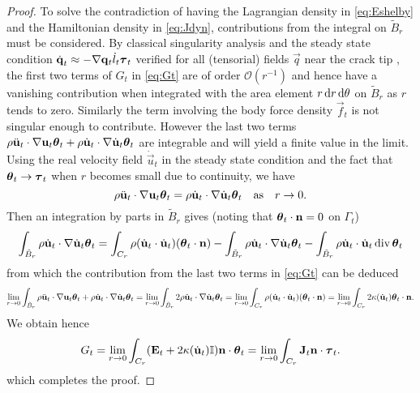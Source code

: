 \begin{proof}
To solve the contradiction \cite{Maugin:1994} of having the Lagrangian density in \eqref{eq:Eshelby} and the Hamiltonian density in \eqref{eq:Jdyn}, contributions from the integral on $\tilde{B}_r$ must be considered. By classical singularity analysis and the steady state condition $\dot{\vec{q}}_t\approx-\nabla\vec{q}_t\dot{l}_t\vtau_t$ verified for all (tensorial) fields $\vec{q}$ near the crack tip \cite{Freund:1990}, the first two terms of $G_t$ in \eqref{eq:Gt} are of order $\mathcal{O}(r^{-1})$ and hence have a vanishing contribution when integrated with the area element $r\,\mathrm{d}r\,\mathrm{d}\theta$ on $\tilde{B}_r$ as $r$ tends to zero. Similarly the term involving the body force density $\vec{f}_t$ is not singular enough to contribute. However the last two terms $\rho\ddot{\vec{u}}_t\cdot\nabla\vec{u}_t\vtheta_t+\rho\dot{\vec{u}}_t\cdot\nabla\dot{\vec{u}}_t\vtheta_t$ are integrable \cite{NishiokaAtluri:1983,NakamuraShihFreund:1985} and will yield a finite value in the limit. Using the real velocity field $\dot{\vec{u}}_t$ in the steady state condition and the fact that $\vtheta_t\to\vtau_t$ when $r$ becomes small due to continuity, we have
\[
\rho\ddot{\vec{u}}_t\cdot\nabla\vec{u}_t\vtheta_t=\rho\dot{\vec{u}}_t\cdot\nabla\dot{\vec{u}}_t\vtheta_t\quad\text{as}\quad r\to 0.
\]
Then an integration by parts in $\tilde{B}_r$ gives (noting that $\vtheta_t\cdot\vec{n}=0$ on $\Gamma_t$)
\begin{equation} \label{eq:magicformula}
\int_{\tilde{B}_r}\rho\dot{\vec{u}}_t\cdot\nabla\dot{\vec{u}}_t\vtheta_t=\int_{C_r}\rho(\dot{\vec{u}}_t\cdot\dot{\vec{u}}_t)(\vtheta_t\cdot\vec{n})-\int_{\tilde{B}_r}\rho\dot{\vec{u}}_t\cdot\nabla\dot{\vec{u}}_t\vtheta_t-\int_{\tilde{B}_r}\rho\dot{\vec{u}}_t\cdot\dot{\vec{u}}_t\div\vtheta_t
\end{equation}
from which the contribution from the last two terms in \eqref{eq:Gt} can be deduced
\[
\lim_{r\to 0}\int_{\tilde{B}_r}\rho\ddot{\vec{u}}_t\cdot\nabla\vec{u}_t\vtheta_t+\rho\dot{\vec{u}}_t\cdot\nabla\dot{\vec{u}}_t\vtheta_t=\lim_{r\to 0}\int_{\tilde{B}_r}2\rho\dot{\vec{u}}_t\cdot\nabla\dot{\vec{u}}_t\vtheta_t=\lim_{r\to 0}\int_{C_r}\rho(\dot{\vec{u}}_t\cdot\dot{\vec{u}}_t)(\vtheta_t\cdot\vec{n})=\lim_{r\to 0}\int_{C_r}2\kappa(\dot{\vec{u}}_t)\vtheta_t\cdot\vec{n}.
\]
We obtain hence
\begin{equation}
G_t=\lim_{r\to 0}\int_{C_r}(\vec{E}_t+2\kappa(\dot{\vec{u}}_t)\mathbb{I})\vec{n}\cdot\vtheta_t=\lim_{r\to 0}\int_{C_r}\vec{J}_t\vec{n}\cdot\vtau_t.
\end{equation}
which completes the proof.
\end{proof}

